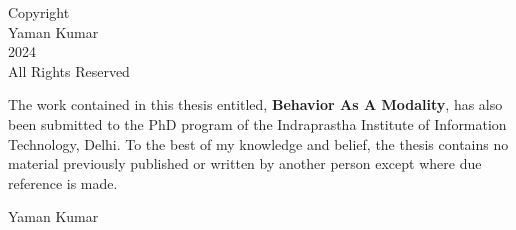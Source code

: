 

\setcounter{page}{2}

\vspace*{\fill}
\begin{center}
    {\large Copyright} \\ %
    \vspace{0.5cm} %
    {\large Yaman Kumar} \\
    \vspace{0.5cm}
    {\large 2024} \\
    \vspace{0.5cm}
    {\large All Rights Reserved}
\end{center}
\vspace*{\fill} %

\newpage

\certificate

\vspace*{0.5in}


\noindent  The work contained in this thesis entitled, \textbf{Behavior As A Modality}, has also been submitted to the PhD program of the Indraprastha Institute of Information Technology, Delhi. To the best of my knowledge and belief, the thesis contains no material previously published or written by another person except where due reference is made.

\vspace*{0.5in}

\noindent Yaman Kumar

\vspace*{0.5in}

